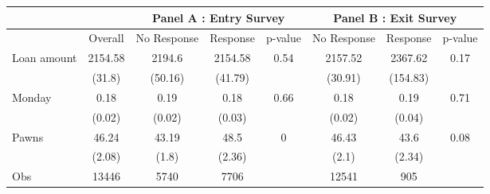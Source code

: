 \begin{tabular}{lcccc|ccc}
\toprule
      &       & \multicolumn{3}{c|}{Panel A : Entry Survey} & \multicolumn{3}{c}{Panel B : Exit Survey} \\
\midrule
\midrule
      & Overall & No Response & Response & p-value & No Response & Response & p-value \\
\midrule
\midrule
Loan amount  & 2154.58 & 2194.6 & 2154.58 & 0.54  & 2157.52 & 2367.62 & 0.17 \\
      & (31.8) & (50.16) & (41.79) &       & (30.91) & (154.83) &  \\
Monday & 0.18  & 0.19  & 0.18  & 0.66  & 0.18  & 0.19  & 0.71 \\
      & (0.02) & (0.02) & (0.03) &       & (0.02) & (0.04) &  \\
Pawns & 46.24 & 43.19 & 48.5  & 0     & 46.43 & 43.6  & 0.08 \\
      & (2.08) & (1.8) & (2.36) &       & (2.1) & (2.34) &  \\
\midrule
Obs   & 13446 & 5740  & 7706  &       & 12541 & 905   &  \\
\bottomrule
\bottomrule
\end{tabular}%
